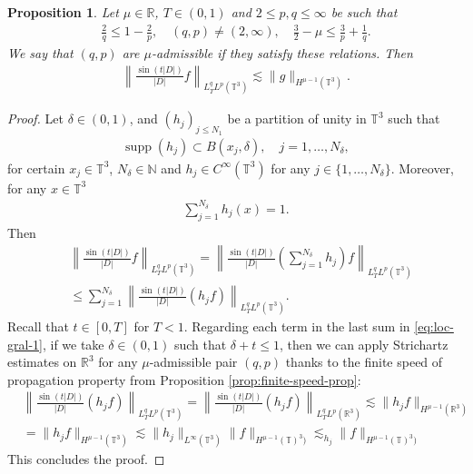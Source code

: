 \documentclass[a4paper, reqno, 11pt]{amsart}
\newtheorem{proposition}[theorem]{Proposition}
\theoremstyle{definition}
\DeclareMathOperator\supp{supp}
\begin{document}
\begin{proposition}\label{prop:st}
		Let $\mu \in \mathbb{R}$, $T \in (0,1)$ and $2 \leq p,q \leq \infty$ be such that
		\begin{align}\label{eq:adm-st}
			\frac{2}{q} \leq 1 - \frac{2}{p}, \quad (q,p) \neq (2,\infty), \quad \frac{3}{2} - \mu \leq \frac{3}{p} + \frac{1}{q}.
		\end{align} 
		We say that $(q,p)$ are $\mu$-admissible if they satisfy these relations. Then
		\begin{align*}
			\left\|\frac{\sin(t|D|)}{|D|} f\right\|_{L^q_TL^p(\mathbb{T}^3)} \lesssim \|g\|_{H^{\mu-1}(\mathbb{T}^3)}. 
		\end{align*}
	\end{proposition}

\begin{proof}
Let $\delta \in (0,1)$, and $(h_j)_{j \leq N_1}$ be a partition of unity in $\mathbb{T}^3$ such that 
\begin{align*}
\supp (h_j) \subset B(x_j,\delta), \quad j  = 1,\dots,N_{\delta},
\end{align*}
for certain $x_j \in \mathbb{T}^3$, $N_{\delta} \in \mathbb{N}$ and $h_j \in C^{\infty}(\mathbb{T}^3)$ for any $j \in \{1,\dots,N_{\delta}\}$. Moreover, for any $x \in \mathbb{T}^3$
\begin{align*}
\sum_{j = 1}^{N_{\delta}} h_j(x) = 1.
\end{align*} 
Then
\begin{align}
&\left\| \frac{\sin(t|D|)}{|D|} f \right\|_{L^q_TL^p(\mathbb{T}^3)} = \left\| \frac{\sin(t|D|)}{|D|} \left( \sum_{j=1}^{N_{\delta}} h_j \right)f \right\|_{L^q_TL^p(\mathbb{T}^3)} \nonumber \\
&\leq \sum_{j=1}^{N_{\delta}}  \left\| \frac{\sin(t|D|)}{|D|}\left(h_j f\right)\right\|_{L^q_TL^p(\mathbb{T}^3)}. \label{eq:loc-gral-1}
\end{align}
Recall that $t \in [0,T]$ for $T < 1$. Regarding each term in the last sum in \eqref{eq:loc-gral-1}, if we take $\delta \in (0,1)$  such that $\delta + t \leq 1$, then we can apply Strichartz estimates on $\mathbb{R}^3$ for any $\mu$-admissible pair $(q,p)$ thanks to the finite speed of propagation property from Proposition \ref{prop:finite-speed-prop}:
\begin{align*}
&\left\| \frac{\sin(t|D|)}{|D|} (h_jf) \right\|_{L^q_TL^p(\mathbb{T}^3)} = \left\| \frac{\sin(t|D|)}{|D|} (h_jf) \right\|_{L^q_TL^p(\mathbb{R}^3)} \lesssim \|h_j f\|_{H^{\mu-1}(\mathbb{R}^3)} \nonumber \\
&= \|h_j f\|_{H^{\mu-1}(\mathbb{T}^3)} \lesssim  \|h_j\|_{L^{\infty}(\mathbb{T}^3)} \|f\|_{H^{\mu-1}(\mathbb{T})^3)}  \lesssim_{h_j} \|f\|_{H^{\mu-1}(\mathbb{T})^3)} 
\end{align*}
This concludes the proof.
\end{proof}
	
\end{document}
